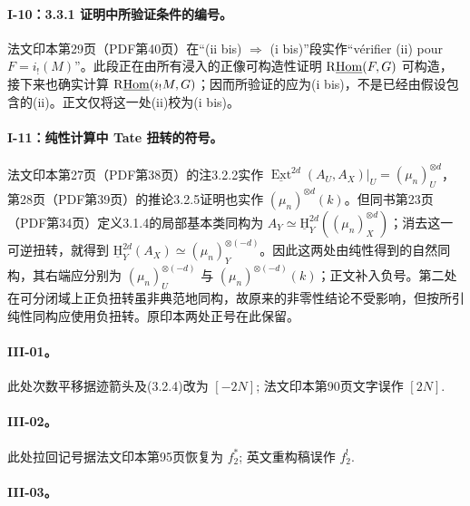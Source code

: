 \hypertarget{collation-I-10}{}

\paragraph*{I-10：3.3.1 证明中所验证条件的编号。}法文印本第29页（PDF第40页）在“(ii bis) $\Rightarrow$ (i bis)”段实作“vérifier (ii) pour $F=i_!(M)$”。此段正在由所有浸入的正像可构造性证明 $\mathrm R\underline{\operatorname{Hom}}(F,G)$ 可构造，接下来也确实计算 $\mathrm R\underline{\operatorname{Hom}}(i_!M,G)$；因而所验证的应为(i bis)，不是已经由假设包含的(ii)。正文仅将这一处(ii)校为(i bis)。

\hypertarget{collation-I-11}{}

\paragraph*{I-11：纯性计算中 Tate 扭转的符号。}法文印本第27页（PDF第38页）的注3.2.2实作 $\underline{\operatorname{Ext}}^{2d}(A_U,A_X)|_U=(\mu_n)_U^{\otimes d}$，第28页（PDF第39页）的推论3.2.5证明也实作 $(\mu_n)^{\otimes d}(k)$。但同书第23页（PDF第34页）定义3.1.4的局部基本类同构为 $A_Y\simeq\underline{\mathrm H}^{2d}_Y((\mu_n)_X^{\otimes d})$；消去这一可逆扭转，就得到 $\underline{\mathrm H}^{2d}_Y(A_X)\simeq(\mu_n)_Y^{\otimes(-d)}$。因此这两处由纯性得到的自然同构，其右端应分别为 $(\mu_n)_U^{\otimes(-d)}$ 与 $(\mu_n)^{\otimes(-d)}(k)$；正文补入负号。第二处在可分闭域上正负扭转虽非典范地同构，故原来的非零性结论不受影响，但按所引纯性同构应使用负扭转。原印本两处正号在此保留。

\hypertarget{collation-III-01}{}

\paragraph*{III-01。}

此处次数平移据迹箭头及(3.2.4)改为 $[-2N]$; 法文印本第90页文字误作 $[2N]$.

\hypertarget{collation-III-02}{}

\paragraph*{III-02。}

此处拉回记号据法文印本第95页恢复为 $f_2^*$; 英文重构稿误作 $f_2^!$.

\hypertarget{collation-III-03}{}

\paragraph*{III-03。}

